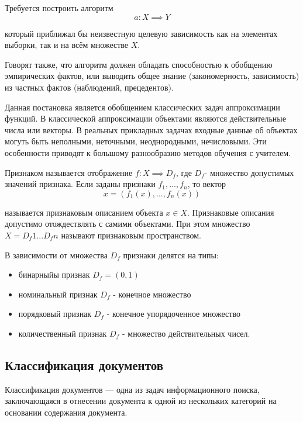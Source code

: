 Требуется построить алгоритм 
\begin{equation}
  a: X \implies Y
\end{equation}
\par
который приближал бы неизвестную целевую зависимость как на элементах выборки, так и на всём множестве $X$. 

Говорят также, что алгоритм должен обладать способностью к обобщению эмпирических фактов, или выводить общее знание (закономерность, зависимость) из частных фактов (наблюдений, прецедентов).

Данная постановка является обобщением классических задач аппроксимации функций. В классической аппроксимации объектами являются действительные числа или векторы. В реальных прикладных задачах входные данные об объектах могуть быть неполными, неточными, неоднородными, нечисловыми. Эти особенности приводят к большому разнообразию методов обучения с учителем. 

Признаком называется отображение $f: X \implies D_f$, где $D_f$- множество допустимых значений признака. Если заданы признаки $f_1,...,f_n$, то вектор
\begin{equation}
  x=(f_1(x),...,f_n(x))
\end{equation}
\par
называется признаковым описанием объекта $x \in X$. Признаковые описания допустимо отождествлять с самими объектами. При этом множество $X=D_f1 ... D_fn$ называют признаковым пространством. 

В зависимости от множества $D_f$ признаки делятся на типы:
\begin{itemize}
  \item бинарныйы признак $D_f=(0,1)$
  \item номинальный признак $D_f$ - конечное множество
  \item порядковый признак $D_f$ - конечное упорядоченное множество
  \item количественный признак $D_f$ - множество действительных чисел.
\end{itemize}

\subsection{Классификация документов}

Классификация документов — одна из задач информационного поиска, заключающаяся в отнесении документа к одной из нескольких категорий на основании содержания документа.

